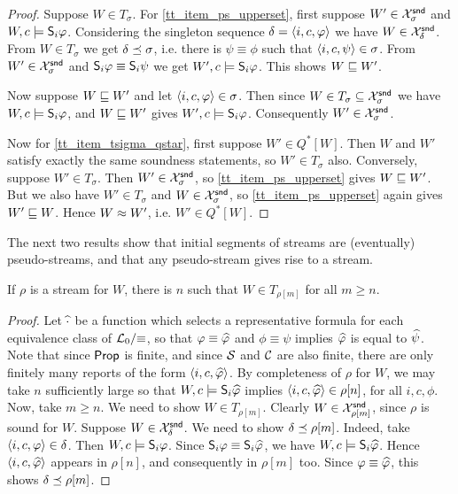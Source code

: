 \begin{proof}

    Suppose $W \in T_\sigma$. For \cref{tt_item_ps_upperset}, first suppose $W'
    \in \Xsnd_\sigma$ and $W, c \models \S_i\phi$.  Considering the singleton
    sequence $\delta = \tuple{i, c, \phi}$ we have $W \in \Xsnd_\delta$. From
    $W \in T_\sigma$ we get $\delta \seqss \sigma$, i.e. there is $\psi \equiv
    \phi$ such that $\tuple{i, c, \psi} \in \sigma$. From $W' \in \Xsnd_\sigma$
    and $\S_i\phi \equiv \S_i\psi$ we get $W', c \models \S_i\phi$.  This shows
    $W \specleq W'$.

    Now suppose $W \specleq W'$ and let $\tuple{i, c, \phi} \in \sigma$. Then
    since $W \in T_\sigma \subseteq \Xsnd_\sigma$ we have $W, c \models
    \S_i\phi$, and $W \specleq W'$ gives $W', c \models \S_i\phi$. Consequently
    $W' \in \Xsnd_\sigma$.

    Now for \cref{tt_item_tsigma_qstar}, first suppose $W' \in Q^*[W]$. Then $W$
    and $W'$ satisfy exactly the same soundness statements, so $W' \in
    T_\sigma$ also.
    Conversely, suppose $W' \in T_\sigma$. Then $W' \in \Xsnd_\sigma$, so
    \cref{tt_item_ps_upperset} gives $W \specleq W'$.  But we also have $W' \in
    T_\sigma$ and $W \in \Xsnd_\sigma$, so \cref{tt_item_ps_upperset} again gives
    $W' \specleq W$. Hence $W \speceq W'$, i.e. $W' \in Q^*[W]$.
\end{proof}

The next two results show that initial segments of streams are (eventually)
pseudo-streams, and that any pseudo-stream gives rise to a stream.

\begin{lemma}
    \label{tt_lemma_stream_to_pseudostream}
    If $\rho$ is a stream for $W$, there is $n$ such that $W \in T_{\rho[m]}$
    for all $m \ge n$.
\end{lemma}

\begin{proof}

    Let $\repr{\cdot}$ be a function which selects a representative formula for
    each equivalence class of $\Lprop / {\equiv}$, so that $\phi \equiv
    \repr{\phi}$ and $\phi \equiv \psi$ implies $\repr{\phi}$ is equal to
    $\repr{\psi}$. Note that since $\propvars$ is finite, and since $\srcs$ and
    $\css$ are also finite, there are only finitely many reports of the form
    $\tuple{i, c, \repr{\phi}}$. By completeness of $\rho$ for $W$, we may take
    $n$ sufficiently large so that $W, c \models \S_i{\repr{\phi}}$ implies
    $\tuple{i, c, \repr{\phi}} \in \rho[n]$, for all $i, c, \phi$.
    Now, take $m \ge n$. We need to show $W \in T_{\rho[m]}$. Clearly $W \in
    \Xsnd_{\rho[m]}$, since $\rho$ is sound for $W$. Suppose $W \in
    \Xsnd_\delta$. We need to show $\delta \seqss \rho[m]$. Indeed, take
    $\tuple{i, c, \phi} \in \delta$. Then $W, c \models \S_i\phi$. Since
    $\S_i\phi \equiv \S_i{\repr{\phi}}$, we have $W, c \models
    \S_i{\repr{\phi}}$. Hence $\tuple{i, c, \repr{\phi}}$ appears in $\rho[n]$,
    and consequently in $\rho[m]$ too. Since $\phi \equiv \repr{\phi}$, this
    shows $\delta \seqss \rho[m]$.
\end{proof}

